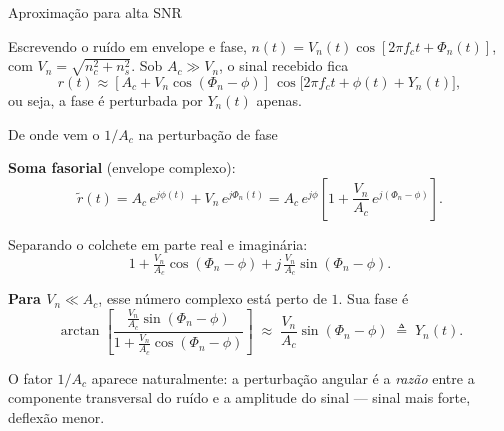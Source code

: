 
\begin{frame}{Aproximação para alta SNR}

\begin{center}
\end{center}

Escrevendo o ruído em envelope e fase, $n(t) = V_n(t)\cos[2\pi f_c t + \Phi_n(t)]$, com $V_n = \sqrt{n_c^2 + n_s^2}$. Sob $A_c \gg V_n$, o sinal recebido fica
\[
r(t) \approx [A_c + V_n\cos(\Phi_n - \phi)]\,\cos\!\bigl[2\pi f_c t + \phi(t) + Y_n(t)\bigr],
\]
ou seja, a fase é perturbada por $Y_n(t)$ apenas.

\end{frame}


\begin{frame}{De onde vem o $1/A_c$ na perturbação de fase}

\textbf{Soma fasorial} (envelope complexo):
\[
\tilde r(t) = A_c\, e^{j\phi(t)} + V_n\, e^{j\Phi_n(t)}
            = A_c\, e^{j\phi}\!\left[1 + \frac{V_n}{A_c}\, e^{j(\Phi_n - \phi)}\right].
\]

Separando o colchete em parte real e imaginária:
\[
1 + \tfrac{V_n}{A_c}\cos(\Phi_n - \phi) + j\,\tfrac{V_n}{A_c}\sin(\Phi_n - \phi).
\]

\textbf{Para $V_n \ll A_c$}, esse número complexo está perto de $1$. Sua fase é
\[
\arctan\!\left[\frac{\tfrac{V_n}{A_c}\sin(\Phi_n-\phi)}{1+\tfrac{V_n}{A_c}\cos(\Phi_n-\phi)}\right]
\;\approx\; \frac{V_n}{A_c}\sin(\Phi_n - \phi) \;\triangleq\; Y_n(t).
\]

O fator $1/A_c$ aparece naturalmente: a perturbação angular é a \emph{razão} entre a componente transversal do ruído e a amplitude do sinal — sinal mais forte, deflexão menor.

\end{frame}

